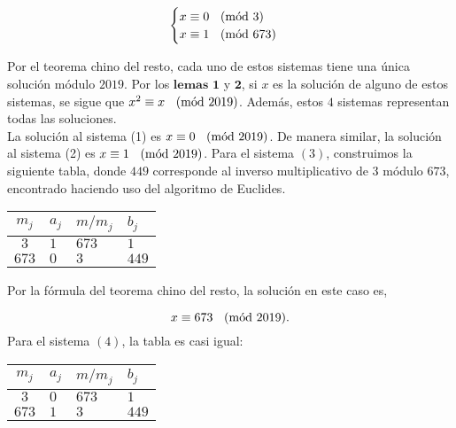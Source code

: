\documentclass{article}
\newcommand{\Mod}[1]{\ \hspace{0.2cm} (\mathrm{m\acute{o}d}\ #1)}
\begin{document}
\begin{equation}
\begin{cases} x \equiv 0 \Mod{3} \\ x \equiv 1 \Mod{673} \end{cases}
\end{equation}

Por el teorema chino del resto, cada uno de estos sistemas tiene una única solución módulo $2019$. Por los $\textbf{lemas 1}$ y $\textbf{2}$, si $x$ es la solución de alguno de estos sistemas, se sigue que $x^{2} \equiv x \Mod{2019}$. Además,  estos $4$ sistemas representan todas las soluciones. \\

 La solución al sistema (1) es $x \equiv 0 \Mod{2019}$.  De manera similar, la solución al sistema (2) es $x \equiv 1 \Mod{2019}$. Para el sistema $(3)$, construimos la siguiente tabla, donde $449$ corresponde al inverso multiplicativo de $3$ módulo $673$, encontrado haciendo uso del algoritmo de Euclides. 
	\begin{table}[h]
		\begin{center}
		\begin{tabularx}{0.5\textwidth}{|c |X|X|X|}
			\hline
			\cellcolor{green!25} $m_{j}$  & \cellcolor{green!25} $a_{j}$ & \cellcolor{green!25} $m/m_{j}$ & \cellcolor{green!25} $b_{j}$  \\ \hline
			$3$ & $1$ & $673$ & $1$  \\ \hline
			$673$ & $0$ & $3$ & $449$  \\ \hline
		\end{tabularx}
	\end{center}
	\end{table}	

Por la fórmula del teorema chino del resto, la solución en este caso es,

$$x \equiv 673 \Mod{2019} .$$
Para el sistema $(4)$, la tabla es casi igual:

\begin{table}[h]
	\begin{center}
		\begin{tabularx}{0.5\textwidth}{|c |X|X|X|}
			\hline
			\cellcolor{blue!25} $m_{j}$  & \cellcolor{blue!25} $a_{j}$ & \cellcolor{blue!25} $m/m_{j}$ & \cellcolor{blue!25} $b_{j}$  \\ \hline
			$3$ & $0$ & $673$ & $1$  \\ \hline
			$673$ & $1$ & $3$ & $449$  \\ \hline
		\end{tabularx}
	\end{center}
\end{table}	
\end{document}

